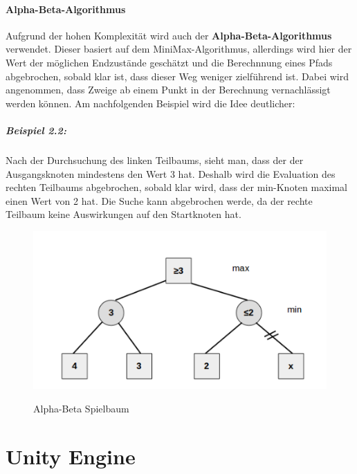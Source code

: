 \paragraph{Alpha-Beta-Algorithmus}
Aufgrund der hohen Komplexität wird auch der \textbf{Alpha-Beta-Algorithmus} verwendet. Dieser basiert auf dem MiniMax-Algorithmus, allerdings wird hier der Wert der möglichen Endzustände geschätzt und die Berechnnung eines Pfads abgebrochen, sobald klar ist, dass dieser Weg weniger zielführend ist. Dabei wird angenommen, dass Zweige ab einem Punkt in der Berechnung vernachlässigt werden können. Am nachfolgenden Beispiel wird die Idee deutlicher:
\subparagraph{Beispiel 2.2:}
Nach der Durchsuchung des linken Teilbaums, sieht man, dass der der Ausgangsknoten mindestens den Wert 3 hat. Deshalb wird die Evaluation des rechten Teilbaums abgebrochen, sobald klar wird, dass der min-Knoten maximal einen Wert von 2 hat. Die Suche kann abgebrochen werde, da der rechte Teilbaum keine Auswirkungen auf den Startknoten hat\nocite{AlphaBeta}.
\begin{figure}[h]
	\centering
	\includegraphics{img/AlphaBeta}
	\caption{Alpha-Beta Spielbaum}
	\cite{AlphaBeta}
	\label{fig:AlphaBeta}
\end{figure}
\section{Unity Engine}
\label{ch:Grundlagen:sec:Unity}
\nocite{ConceptArt}

